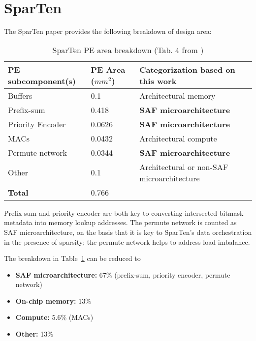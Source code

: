 \section{SparTen\cite{sparten}}

The SparTen paper provides the following breakdown of design area:

\begin{table}
\caption{SparTen PE area breakdown (Tab. 4 from \cite{sparten})}
\label{tab:sparten_pe_breakdown}
\begin{center}
\begin{tabular}{||l|l|l||}\hline
\textbf{PE subcomponent(s)} & \textbf{PE Area ($mm^2$)}  & \textbf{Categorization based on this work}  \\\hline
Buffers	   & 0.1 & Architectural memory \\\hline
Prefix-sum	   & 0.418 & \textbf{SAF microarchitecture} \\\hline
Priority Encoder	   & 0.0626 & \textbf{SAF microarchitecture} \\\hline
MACs	   & 0.0432 & Architectural compute \\\hline
Permute network	   & 0.0344 & \textbf{SAF microarchitecture} \\\hline
Other	   & 0.1 & Architectural or non-SAF microarchitecture \\\hline
\textbf{Total}	   & 0.766 & \\\hline
\end{tabular}
\end{center}
\end{table}

Prefix-sum and priority encoder are both key to converting intersected bitmask metadata into memory lookup addresses. The permute network is counted as SAF microarchitecture, on the basis that it is key to SparTen's data orchestration in the presence of sparsity; the permute network helps to address load imbalance.

The breakdown in Table~\ref{tab:sparten_pe_breakdown} can be reduced to

\begin{itemize}
    \item \textbf{SAF microarchitecture:} 67\% (prefix-sum, priority encoder, permute network)
    \item \textbf{On-chip memory:} 13\% 
    \item \textbf{Compute:} 5.6\% (MACs)
    \item \textbf{Other:} 13\%
\end{itemize}

